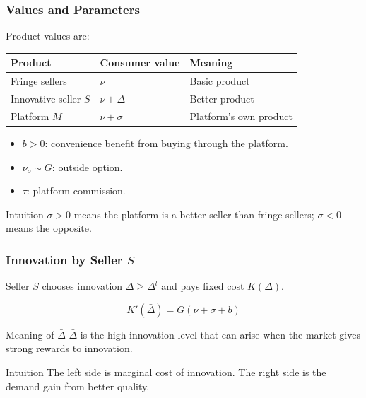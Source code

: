 \documentclass[aspectratio=169,AutoFakeBold,AutoFakeSlant]{beamer}
\begin{document}
\begin{frame}
  \frametitle{Values and Parameters}
  \small
  Product values are:

  \begin{center}
    \begin{tabular}{lll}
      \toprule
      Product & Consumer value & Meaning \\
      \midrule
      Fringe sellers & $\nu$ & Basic product \\
      Innovative seller $S$ & $\nu+\Delta$ & Better product \\
      Platform $M$ & $\nu+\sigma$ & Platform's own product \\
      \bottomrule
    \end{tabular}
  \end{center}

  \begin{itemize}
    \item $b>0$: convenience benefit from buying through the platform.
    \item $\nu_o \sim G$: outside option.
    \item $\tau$: platform commission.
  \end{itemize}

  \begin{block}{Intuition}
    $\sigma>0$ means the platform is a better seller than fringe sellers; $\sigma<0$ means the opposite.
  \end{block}
\end{frame}

\begin{frame}
  \frametitle{Innovation by Seller $S$}
  \small
  Seller $S$ chooses innovation $\Delta \geq \Delta^l$ and pays fixed cost $K(\Delta)$.

  \begin{equation*}
    K'(\bar{\Delta}) = G(\nu+\sigma+b)
  \end{equation*}

  \begin{block}{Meaning of $\bar{\Delta}$}
    $\bar{\Delta}$ is the high innovation level that can arise when the market gives strong rewards to innovation.
  \end{block}

  \begin{alertblock}{Intuition}
    The left side is marginal cost of innovation. The right side is the demand gain from better quality.
  \end{alertblock}
\end{frame}
\end{document}
